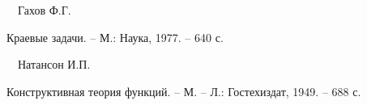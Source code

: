 \vskip 2cm












\label{end}











\item[\norm 3.]{\curs \ \ Гахов Ф.Г. \/}


{\norm Краевые задачи. -- М.: Наука, 1977. -- 640 с.}





\item[\norm 5.]{\curs \ \ Натансон И.П. \/}


{\norm Конструктивная теория функций. -- М. -- Л.: Гостехиздат, 1949. -- 688 с. }





